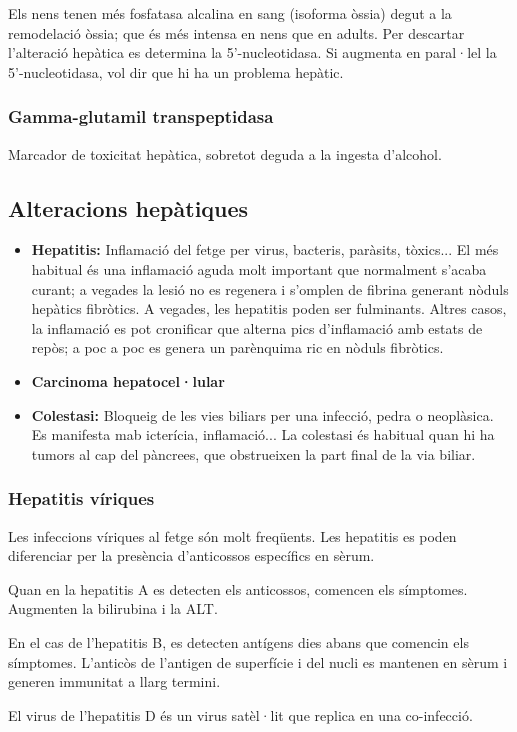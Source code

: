 Els nens tenen més fosfatasa alcalina en sang (isoforma òssia) degut a
la remodelació òssia; que és més intensa en nens que en adults. Per
descartar l'alteració hepàtica es determina la 5'-nucleotidasa. Si
augmenta en paral·lel la 5'-nucleotidasa, vol dir que hi ha un
problema hepàtic.

\subsubsection{Gamma-glutamil transpeptidasa}
\label{sec:gamma-glut-transp}
Marcador de toxicitat hepàtica, sobretot deguda a la ingesta d'alcohol.


\subsection{Alteracions hepàtiques}
\label{sec:alter-hepat}
\begin{itemize}
\item \textbf{Hepatitis:} Inflamació del fetge per virus, bacteris, paràsits,
  tòxics...  El més habitual és una inflamació aguda molt important
  que normalment s'acaba curant; a vegades la lesió no es regenera i
  s'omplen de fibrina generant nòduls hepàtics fibròtics. A vegades,
  les hepatitis poden ser fulminants. Altres casos, la inflamació es
  pot cronificar que alterna pics d'inflamació amb estats de repòs; a
  poc a poc es genera un parènquima ric en nòduls fibròtics.

\item \textbf{Carcinoma hepatocel·lular}

\item \textbf{Colestasi:} Bloqueig de les vies biliars per una
  infecció, pedra o neoplàsica. Es manifesta mab icterícia,
  inflamació... La colestasi és habitual quan hi ha tumors al cap del
  pàncrees, que obstrueixen la part final de la via biliar.
\end{itemize}

\subsubsection{Hepatitis víriques}
\label{sec:hepatitis-viriques}
Les infeccions víriques al fetge són molt freqüents. Les hepatitis es
poden diferenciar per la presència d'anticossos específics en sèrum.

Quan en la hepatitis A es detecten els anticossos, comencen els
símptomes. Augmenten la bilirubina i la ALT.

En el cas de l'hepatitis B, es detecten antígens dies abans que
comencin els símptomes. L'anticòs de l'antigen de superfície i del
nucli es mantenen en sèrum i generen immunitat a llarg termini.

El virus de l'hepatitis D és un virus satèl·lit que replica en una
co-infecció. 